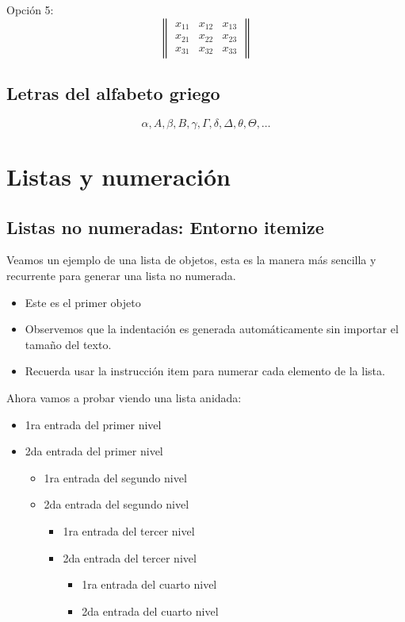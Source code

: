 \documentclass[12pt]{article}
\begin{document}
Opción 5:
\begin{equation}
   \begin{Vmatrix}
     x_{11} & x_{12} & x_{13} \\
     x_{21} & x_{22} & x_{23}\\
     x_{31} & x_{32} & x_{33}
    \end{Vmatrix}
\end{equation}

\subsection{Letras del alfabeto griego}
\[ \alpha, A, \beta, B, \gamma, \Gamma, \delta, \Delta, \theta, \Theta, \dots
\]


\section{Listas y numeración}
\subsection{Listas no numeradas: Entorno itemize}
Veamos un ejemplo de una lista de objetos, esta es la manera más sencilla y recurrente para generar una lista no numerada.
\begin{itemize}
    \item Este es el primer objeto
    \item Observemos que la indentación es generada automáticamente sin importar el tamaño del texto.
    \item Recuerda usar la instrucción item para numerar cada elemento de la lista.
\end{itemize}
Ahora vamos a probar viendo una lista anidada:
\begin{itemize}
    \item 1ra entrada del primer nivel
    \item 2da entrada del primer nivel
    \begin{itemize}
        \item 1ra entrada del segundo nivel
        \item 2da entrada del segundo nivel
        \begin{itemize}
            \item 1ra entrada del tercer nivel
            \item 2da entrada del tercer nivel
            \begin{itemize}
                \item 1ra entrada del cuarto nivel
                \item 2da entrada del cuarto nivel
            \end{itemize}
        \end{itemize}
    \end{itemize}
\end{itemize}
\end{document}
